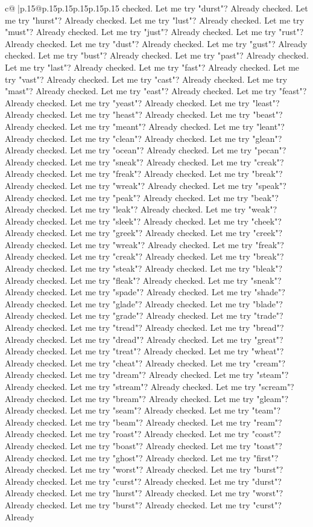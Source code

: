 \documentclass{article}
\begin{document}
{\begin{supertabular}{c@{$\;$}|p{.15\linewidth}@{}p{.15\linewidth}p{.15\linewidth}p{.15\linewidth}p{.15\linewidth}p{.15\linewidth}}
{{{checked. Let me try "durst"? Already checked. Let me try "hurst"? Already checked. Let me try "lust"? Already checked. Let me try "must"? Already checked. Let me try "just"? Already checked. Let me try "rust"? Already checked. Let me try "dust"? Already checked. Let me try "gust"? Already checked. Let me try "bust"? Already checked. Let me try "past"? Already checked. Let me try "last"? Already checked. Let me try "fast"? Already checked. Let me try "vast"? Already checked. Let me try "cast"? Already checked. Let me try "mast"? Already checked. Let me try "east"? Already checked. Let me try "feast"? Already checked. Let me try "yeast"? Already checked. Let me try "least"? Already checked. Let me try "heast"? Already checked. Let me try "beast"? Already checked. Let me try "meant"? Already checked. Let me try "leant"? Already checked. Let me try "clean"? Already checked. Let me try "glean"? Already checked. Let me try "ocean"? Already checked. Let me try "pecan"? Already checked. Let me try "sneak"? Already checked. Let me try "creak"? Already checked. Let me try "freak"? Already checked. Let me try "break"? Already checked. Let me try "wreak"? Already checked. Let me try "speak"? Already checked. Let me try "peak"? Already checked. Let me try "beak"? Already checked. Let me try "leak"? Already checked. Let me try "weak"? Already checked. Let me try "sleek"? Already checked. Let me try "cheek"? Already checked. Let me try "greek"? Already checked. Let me try "creek"? Already checked. Let me try "wreak"? Already checked. Let me try "freak"? Already checked. Let me try "creak"? Already checked. Let me try "break"? Already checked. Let me try "steak"? Already checked. Let me try "bleak"? Already checked. Let me try "fleak"? Already checked. Let me try "sneak"? Already checked. Let me try "spade"? Already checked. Let me try "shade"? Already checked. Let me try "glade"? Already checked. Let me try "blade"? Already checked. Let me try "grade"? Already checked. Let me try "trade"? Already checked. Let me try "tread"? Already checked. Let me try "bread"? Already checked. Let me try "dread"? Already checked. Let me try "great"? Already checked. Let me try "treat"? Already checked. Let me try "wheat"? Already checked. Let me try "cheat"? Already checked. Let me try "cream"? Already checked. Let me try "dream"? Already checked. Let me try "steam"? Already checked. Let me try "stream"? Already checked. Let me try "scream"? Already checked. Let me try "bream"? Already checked. Let me try "gleam"? Already checked. Let me try "seam"? Already checked. Let me try "team"? Already checked. Let me try "beam"? Already checked. Let me try "ream"? Already checked. Let me try "roast"? Already checked. Let me try "coast"? Already checked. Let me try "boast"? Already checked. Let me try "toast"? Already checked. Let me try "ghost"? Already checked. Let me try "first"? Already checked. Let me try "worst"? Already checked. Let me try "burst"? Already checked. Let me try "curst"? Already checked. Let me try "durst"? Already checked. Let me try "hurst"? Already checked. Let me try "worst"? Already checked. Let me try "burst"? Already checked. Let me try "curst"? Already }}}
\end{supertabular}}
\end{document}
